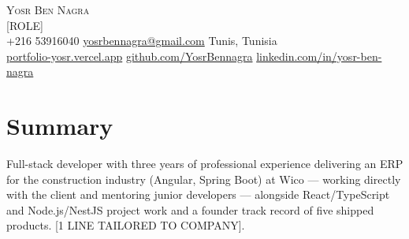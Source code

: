 \documentclass[10pt,a4paper]{article}
\begin{document}
\begin{center}
  {\LARGE\scshape Yosr Ben Nagra}\\[3pt]
  {\normalsize\color{soft} [ROLE]}\\[4pt]
  {\footnotesize
    +216 53916040 \; \textperiodcentered \; \href{mailto:yosrbennagra@gmail.com}{yosrbennagra@gmail.com}
    \; \textperiodcentered \; Tunis, Tunisia\\[1pt]
    \href{https://portfolio-yosr.vercel.app/en}{portfolio-yosr.vercel.app}
    \; \textperiodcentered \; \href{https://github.com/YosrBennagra}{github.com/YosrBennagra}
    \; \textperiodcentered \; \href{https://www.linkedin.com/in/yosr-ben-nagra/}{linkedin.com/in/yosr-ben-nagra}
  }
\end{center}

\vspace{-2pt}
\section*{Summary}
{\small
Full-stack developer with three years of professional experience delivering an
ERP for the construction industry (Angular, Spring Boot) at Wico --- working
directly with the client and mentoring junior developers --- alongside
React/TypeScript and Node.js/NestJS project work and a founder track record of
five shipped products. [1 LINE TAILORED TO COMPANY].
}

\end{document}
